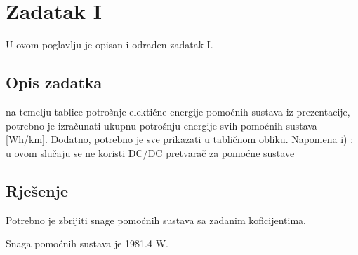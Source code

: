 \chapter{Zadatak I} \label{ch:i}

U ovom poglavlju je opisan i odrađen zadatak I.

\section{Opis zadatka} \label{sec:i:opis}

na temelju tablice potrošnje elektične energije pomoćnih sustava iz prezentacije, potrebno je
izračunati ukupnu potrošnju energije svih pomoćnih sustava [Wh/km]. Dodatno, potrebno je sve
prikazati u tabličnom obliku.
Napomena i) : u ovom slučaju se ne koristi DC/DC pretvarač za pomoćne sustave

\section{Rješenje} \label{sec:i:rjesenje}

Potrebno je zbrijiti snage pomoćnih sustava sa zadanim koficijentima.

Snaga pomoćnih sustava je 1981.4 W.